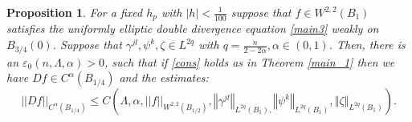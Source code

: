 \documentclass[12pt,leqno]{amsart}%
\theoremstyle{plain}
\newtheorem{proposition}{Proposition}[section]
\numberwithin{equation}{section}
\theoremstyle{definition}
\begin{document}
\begin{comment}
\begin{proposition}
\label{reg} For a fixed $h_{p}$ with $\left\vert h\right\vert <\frac{1}{100}$
suppose that $f\in W^{2,2}(B_{1})$ satisfies the uniformly elliptic weak
double divergence equation (\ref{main3}) on $B_{3/4}(0)$, in the sense that
(\ref{main3}) holds for every $\eta\in C_{c}^{\infty}(B_{3/4})$. Choose
$\alpha\in(0,\frac{1}{2})$ and suppose that $\gamma^{jl},\psi^{k}\in
L^{2q},\zeta\in L^{2nq/(n+2)}$ and condition (\ref{cons}) is satisfied as in
Theorem \ref{main_1}. Then $Df\in C^{\alpha}(B_{1/4})$ and satisfies the
following estimate:
\begin{equation}
||Df||_{C^{\alpha}(B_{1/4})}\leq C(\Lambda,||f||_{W^{2,2}(B_{1/2})},\left\Vert
\gamma^{jl}\right\Vert _{L^{2q},}\left\Vert \psi^{k}\right\Vert _{L^{2q}%
},\left\Vert \zeta\right\Vert _{L^{2nq/(n+2)}},\alpha,C_{1},C_{2}%
).\label{est1}%
\end{equation}
\end{proposition}
\end{comment}


\begin{proposition}
\label{reg} For a fixed $h_{p}$ with $\left\vert h\right\vert <\frac{1}{100}$
suppose that $f\in W^{2,2}(B_{1})$ satisfies the uniformly elliptic double
divergence equation \eqref{main3} weakly on $B_{3/4}(0)$. Suppose that
$\gamma^{jl},\psi^{k}, \zeta\in L^{2q}$ with $q=\frac{n}{2-2\alpha}, \alpha
\in(0,1)$. Then, there is an $\varepsilon_{0}(n, \Lambda, \alpha)>0$, such
that if \eqref{cons} holds as in Theorem \ref{main_1} then we have $Df\in
C^{\alpha}(B_{1/4})$ and the estimates:
\begin{equation}
||Df||_{C^{\alpha}(B_{1/4})}\leq C(\Lambda,\alpha, ||f||_{W^{2,2}(B_{1/2}%
)},\left\Vert \gamma^{jl}\right\Vert _{L^{2q}(B_{1}),}\left\Vert \psi
^{k}\right\Vert _{L^{2q}(B_{1}) },\left\Vert \zeta\right\Vert _{L^{2q}(B_{1}%
)}). \label{est1}%
\end{equation}

\end{proposition}
\end{document}
